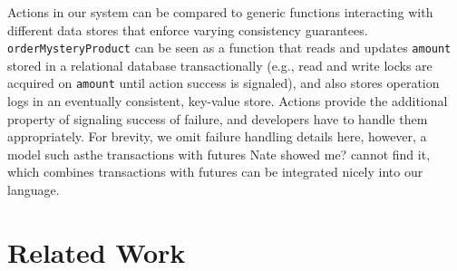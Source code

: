 \documentclass[preprint,numbers]{sigplanconf}
\begin{document}
Actions in our system can be compared to generic functions interacting
with different data stores that enforce varying consistency guarantees.
\texttt{orderMysteryProduct} can be seen as a function that
reads and updates \texttt{amount} stored in a relational database
transactionally (e.g., read and write locks are acquired on \texttt{amount} until
action success is signaled), and also stores operation logs in an eventually consistent,
key-value store. Actions provide the additional property of signaling success
of failure, and developers have to handle them appropriately. For brevity, we
omit failure handling details here, however, a model such as{the transactions
  with futures Nate showed me? cannot find it}, which combines transactions with
futures can be integrated
nicely into our language. 

\section{Related Work}
\end{document}
